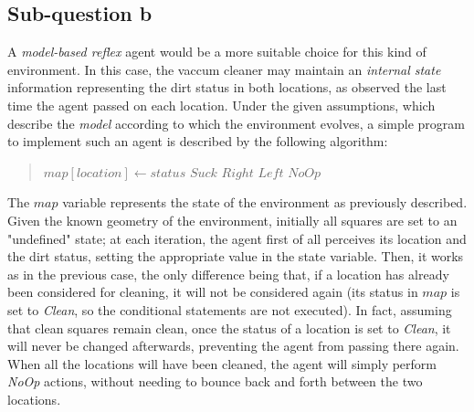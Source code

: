 \documentclass[letterpaper,headings=standardclasses]{scrartcl}
\begin{document}
\subsection{Sub-question b}

A \emph{model-based reflex} agent would be a more suitable choice for this kind of environment. In this case, the vaccum cleaner may maintain an \emph{internal state} information representing the dirt status in both locations, as observed the last time the agent passed on each location. Under the given assumptions, which describe the \emph{model} according to which the environment evolves, a simple program to implement such an agent is described by the following algorithm:

\begin{quote}
\begin{algorithmic}

  \State $map[location] \gets status$
   \Return $Suck$
   \Return $Right$
   \Return $Left$
  \Else{} \Return $NoOp$
  \EndIf
\EndFunction

\end{algorithmic}
\end{quote}

The $map$ variable represents the state of the environment as previously described. Given the known geometry of the environment, initially all squares are set to an "undefined" state; at each iteration, the agent first of all perceives its location and the dirt status, setting the appropriate value in the state variable. Then, it works as in the previous case, the only difference being that, if a location has already been considered for cleaning, it will not be considered again (its status in $map$ is set to \emph{Clean}, so the conditional statements are not executed). In fact, assuming that clean squares remain clean, once the status of a location is set to \emph{Clean}, it will never be changed afterwards, preventing the agent from passing there again. When all the locations will have been cleaned, the agent will simply perform \emph{NoOp} actions, without needing to bounce back and forth between the two locations.
\end{document}
